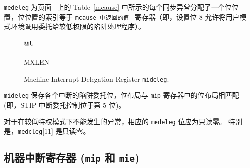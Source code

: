 {\tt medeleg} 为页面~\pageref{mcause} 上的 Table~\ref{mcause} 中所示的每个同步异常分配了一个位位置，位位置的索引等于 {\tt mcause 中返回的值 } 寄存器（即，设置位 8 允许将用户模式环境调用委托给较低权限的陷阱处理程序）。

\begin{figure}[h!]
{\footnotesize
\begin{center}
\begin{tabular}{@{}U}
 \\
\hline
{} \\
\hline
MXLEN \\
\end{tabular}
\end{center}
}
\vspace{-0.1in}
\caption{Machine Interrupt Delegation Register {\tt mideleg}.}
\label{midelegreg}
\end{figure}

\iffalse
{\tt mideleg} holds trap delegation bits for individual interrupts, with the
layout of bits matching those in the {\tt mip} register (i.e., STIP interrupt
delegation control is located in bit 5).

For exceptions that cannot occur in less privileged modes, the corresponding
{\tt medeleg} bits should be read-only zero.  In particular,
{\tt medeleg}[11] is read-only zero.
\fi

{\tt mideleg} 保存各个中断的陷阱委托位，位布局与 {\tt mip} 寄存器中的位布局相匹配(即，STIP 中断委托控制位于第 5 位)。

对于在较低特权模式下不能发生的异常，相应的 {\tt medeleg} 位应为只读零。 特别是，{\tt medeleg}[11] 是只读零。

\subsection{机器中断寄存器 ({\tt mip} 和 {\tt mie})}

\iffalse
The {\tt mip} register is an MXLEN-bit read/write register containing
information on pending interrupts, while {\tt mie} is the
corresponding MXLEN-bit read/write register containing interrupt enable
bits.
Interrupt cause number \textit{i} (as reported in CSR {\tt mcause},
Section~\ref{sec:mcause}) corresponds with bit~\textit{i} in both
{\tt mip} and {\tt mie}.
Bits 15:0 are allocated to standard interrupt causes only, while bits 16
and above are designated for platform or custom use.
\fi

